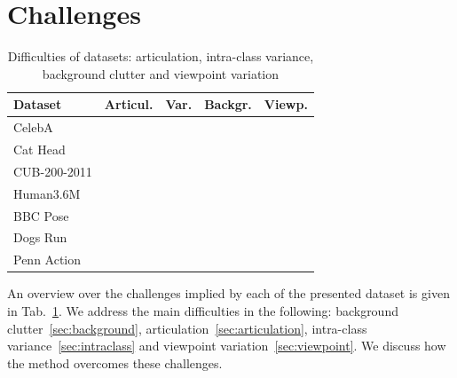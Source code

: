 \section{Challenges}\label{sec:challenges}
	\begin{table}
		\centering
		\caption{Difficulties of datasets: articulation, intra-class variance, background clutter and viewpoint variation}
		\label{tab:challenges}
		\begin{tabular}{l|rrrr}
			\hline
			Dataset &  Articul.& Var. &  Backgr.& Viewp.  \\ \hline
			CelebA &   &  &  &    \\
			Cat Head & &  \checkmark&  &   \\
			CUB-200-2011 & & \checkmark& \checkmark&   \\
			Human3.6M &\checkmark& &  & \checkmark  \\
			BBC Pose &  \checkmark&  & \checkmark&  \\
			Dogs Run & \checkmark& \checkmark& \checkmark&   \\
			Penn Action & \checkmark& \checkmark& \checkmark& \checkmark  \\
			\hline
		\end{tabular}
	\end{table}
	An overview over the challenges implied by each of the presented dataset is given in Tab.~\ref{tab:challenges}. We address the main difficulties in the following: background clutter~\ref{sec:background}, articulation~\ref{sec:articulation}, intra-class variance~\ref{sec:intraclass} and viewpoint variation~\ref{sec:viewpoint}.
	We discuss how the method overcomes these challenges.


